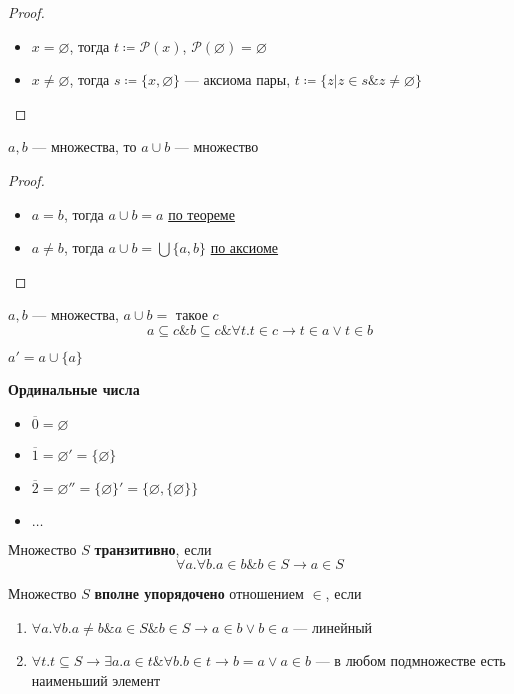 \documentclass[english]{article}
\begin{document}
\begin{proof}
	\-
	\begin{itemize}
		\item \(x = \varnothing\), тогда \(t \coloneqq \mathcal{P}(x)\), \(\mathcal{P}(\varnothing) = \varnothing\)
		\item \(x \neq \varnothing\), тогда \(s \coloneqq \{x, \varnothing\}\) --- аксиома пары, \(t \coloneqq \{z \big| z \in s \& z \neq \varnothing\}\)
	\end{itemize}
	\label{orgdaefbb7}
\end{proof}
\begin{theorem}
	\(a, b\) --- множества, то \(a \cup b\) --- множество
\end{theorem}
\begin{proof}
	\-
	\begin{itemize}
		\item \(a = b\), тогда \(a\cup b = a\) \hyperref[orgdaefbb7]{по теореме}
		\item \(a \neq b\), тогда \(a\cup b = \bigcup\{a, b\}\) \hyperref[orgc77f1a7]{по аксиоме}
	\end{itemize}
\end{proof}
\begin{symb}
	\(a, b\) --- множества, \(a \cup b =\) такое \(c\)
	\[ a \subseteq c \& b \subseteq c \& \forall t. t\in c \to t \in a \vee t \in b \]
\end{symb}
\begin{definition}
	\(a' = a \cup \{a\}\)
	\label{org7fb50af}
\end{definition}
\begin{definition}
	\textbf{Ординальные числа}
	\begin{itemize}
		\item \(\overline{0} = \varnothing\)
		\item \(\overline{1} = \varnothing' = \{\varnothing\}\)
		\item \(\overline{2} = \varnothing'' = \{\varnothing\}' = \{\varnothing, \{\varnothing\}\}\)
		\item \(\dots\)
	\end{itemize}
	\label{org218e5fa}
\end{definition}
\begin{definition}
	Множество \(S\) \textbf{транзитивно}, если
	\[ \forall a. \forall b. a \in b \& b \in S \to a \in S \]
	\label{orgf3884fa}
\end{definition}
\begin{definition}
	Множество \(S\) \textbf{вполне упорядочено} отношением \(\in\), если
	\begin{enumerate}
		\item \(\forall a. \forall b. a\neq b\& a \in S \& b \in S \to a \in b \vee b \in a\) --- линейный
		\item \(\forall t. t \subseteq S \to \exists a. a\in t \&\forall b. b \in t \to b = a \vee a \in b\) --- в любом подмножестве есть наименьший элемент
	\end{enumerate}
	\label{org75fb523}
\end{definition}
\end{document}
